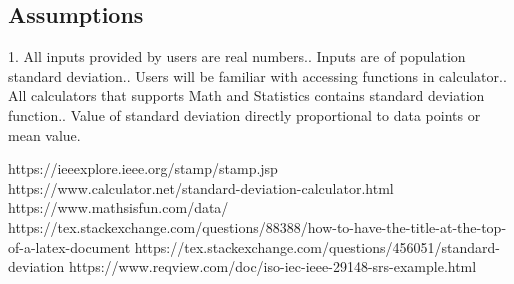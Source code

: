 \documentclass{article}
\begin{document}
\begin{titlepage}
\section{Assumptions}
1.	All inputs provided by users are real numbers..	Inputs are of population standard deviation..	Users will be familiar with accessing functions in calculator..	All calculators that supports Math and Statistics contains standard deviation function..	Value of standard deviation directly proportional to data points or mean value.\newline



https://ieeexplore.ieee.org/stamp/stamp.jsp\newline
https://www.calculator.net/standard-deviation-calculator.html\newline
https://www.mathsisfun.com/data/\newline
https://tex.stackexchange.com/questions/88388/how-to-have-the-title-at-the-top-of-a-latex-document\newline
https://tex.stackexchange.com/questions/456051/standard-deviation
https://www.reqview.com/doc/iso-iec-ieee-29148-srs-example.html


\end{titlepage}
\end{document}
